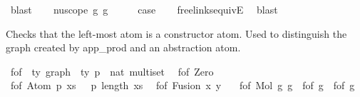 \begin{isabellebody}
\ blast\isanewline
{}\isamarkupfalse%
\isanewline
\ \ \isamarkupfalse%
\ {\isacharparenleft}{\kern0pt}nu{\isacharunderscore}{\kern0pt}scope\ g{}\ g{}{\isacharparenright}{\kern0pt}\isanewline
\ \ \isamarkupfalse%
\ \isamarkupfalse%
\ {\isacharquery}{\kern0pt}case\isanewline
\ \ \isamarkupfalse%
\ freelinks{\isacharunderscore}{\kern0pt}equiv{\isacharunderscore}{\kern0pt}E{}{}\ \isamarkupfalse%
\ blast\isanewline
{}\isamarkupfalse%
%
\endisatagproof
{\isafoldproof}%
%
\isadelimproof
%
\endisadelimproof
%
\isadelimdocument
%
\endisadelimdocument
%
\isatagdocument
%
\isamarkuptrue%
%
\endisatagdocument
{\isafolddocument}%
%
\isadelimdocument
%
\endisadelimdocument
%
\begin{isamarkuptext}%
Checks that the left-most atom is a constructor atom.
Used to distinguish the graph created by app\_prod and an abstraction atom.%
\end{isamarkuptext}\isamarkuptrue%
\isamarkupfalse%
\ f{\isacharunderscore}{\kern0pt}of\ {\isacharcolon}{\kern0pt}{\isacharcolon}{\kern0pt}\ {\isachardoublequoteopen}{\isacharprime}{\kern0pt}ty\ graph\ {\isacharequal}{\kern0pt}{\isachargreater}{\kern0pt}\ {\isacharparenleft}{\kern0pt}{\isacharprime}{\kern0pt}ty\ p\ {\isacharasterisk}{\kern0pt}\ nat{\isacharparenright}{\kern0pt}\ multiset{\isachardoublequoteclose}\isanewline
{}\isanewline
\ \ {\isachardoublequoteopen}f{\isacharunderscore}{\kern0pt}of\ Zero\ {\isacharequal}{\kern0pt}\ {\isacharbraceleft}{\kern0pt}{\isacharhash}{\kern0pt}{\isacharbraceright}{\kern0pt}{\isachardoublequoteclose}\isanewline
{\isacharbar}{\kern0pt}\ {\isachardoublequoteopen}f{\isacharunderscore}{\kern0pt}of\ {\isacharparenleft}{\kern0pt}Atom\ p\ xs{\isacharparenright}{\kern0pt}\ {\isacharequal}{\kern0pt}\ {\isacharbraceleft}{\kern0pt}{\isacharhash}{\kern0pt}\ {\isacharparenleft}{\kern0pt}p{\isacharcomma}{\kern0pt}\ length\ xs{\isacharparenright}{\kern0pt}\ {\isacharhash}{\kern0pt}{\isacharbraceright}{\kern0pt}{\isachardoublequoteclose}\isanewline
{\isacharbar}{\kern0pt}\ {\isachardoublequoteopen}f{\isacharunderscore}{\kern0pt}of\ {\isacharparenleft}{\kern0pt}Fusion\ x\ y{\isacharparenright}{\kern0pt}\ {\isacharequal}{\kern0pt}\ {\isacharbraceleft}{\kern0pt}{\isacharhash}{\kern0pt}{\isacharbraceright}{\kern0pt}{\isachardoublequoteclose}\isanewline
{\isacharbar}{\kern0pt}\ {\isachardoublequoteopen}f{\isacharunderscore}{\kern0pt}of\ {\isacharparenleft}{\kern0pt}Mol\ g{}\ g{}{\isacharparenright}{\kern0pt}\ {\isacharequal}{\kern0pt}\ f{\isacharunderscore}{\kern0pt}of\ g{}\ {\isacharplus}{\kern0pt}\ f{\isacharunderscore}{\kern0pt}of\ g{}{\isachardoublequoteclose}\isanewline

\end{isabellebody}
